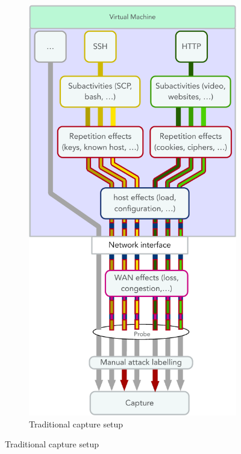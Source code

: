 \documentclass[sigconf]{acmart}
\begin{document}
\begin{figure}
\centering
\begin{subfigure}[b]{0.46\textwidth}
\includegraphics[width=\textwidth]{images/VM_capture.pdf}
\caption{Traditional capture setup}
\end{subfigure}


\end{figure}
\end{document}
